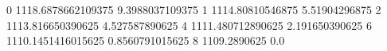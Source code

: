 0 1118.6878662109375 9.3988037109375
1 1114.80810546875 5.51904296875
2 1113.816650390625 4.527587890625
4 1111.480712890625 2.191650390625
6 1110.1451416015625 0.8560791015625
8 1109.2890625 0.0

